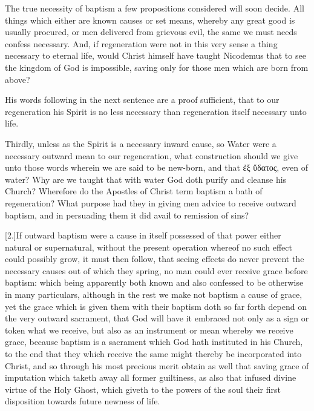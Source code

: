 The true necessity of baptism a few propositions considered will soon decide. All things which either are known causes or set means, whereby any great good is usually procured, or men delivered from grievous evil, the same we must needs confess necessary. And, if regeneration were not in this very  sense a thing necessary to eternal life, would Christ himself have taught Nicodemus that to see the kingdom of God is impossible, saving only for those men which are born from above?

His words following in the next sentence are a proof sufficient, that to our regeneration his Spirit is no less necessary than regeneration itself necessary unto life.

Thirdly, unless as the Spirit is a necessary inward cause, so Water were a necessary outward mean to our regeneration, what construction should we give unto those words wherein we are said to be new-born, and that ἐξ ὕδατος, even of water? Why are we taught that with water God doth purify and cleanse his Church? Wherefore do the Apostles of Christ term baptism a bath of regeneration? What purpose had they in giving men advice to receive outward baptism, and in persuading them it did avail to remission of sins?

[2.]If outward baptism were a cause in itself possessed of that power either natural or supernatural, without the present operation whereof no such effect could possibly grow, it must then follow, that seeing effects do never prevent the necessary causes out of which they spring, no man could ever receive grace before baptism: which being apparently both known and also confessed to be otherwise in many particulars, although in the rest we make not baptism a cause of grace, yet the grace which is given them with their baptism doth so far forth depend on the very outward sacrament, that God will have it embraced not only as a sign or token what we receive, but also as an instrument or mean whereby we receive grace, because baptism is a sacrament which God hath instituted in his Church, to the end that they which receive the same might thereby be incorporated into Christ, and so through his most precious merit obtain as well that saving grace of imputation which taketh away all former guiltiness,  as also that infused divine virtue of the Holy Ghost, which giveth to the powers of the soul their first disposition towards future newness of life.

